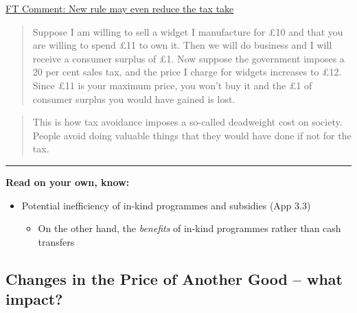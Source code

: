 \documentclass[]{article}
\providecommand{\tightlist}{%
  \setlength{\itemsep}{0pt}\setlength{\parskip}{0pt}}
\begin{document}
\href{https://www.ft.com/content/4ea6ab2c-f900-11e2-86e1-00144feabdc0}{FT
Comment: New rule may even reduce the tax take}

\begin{quote}
Suppose I am willing to sell a widget I manufacture for £10 and that you
are willing to spend £11 to own it. Then we will do business and I will
receive a consumer surplus of £1. Now suppose the government imposes a
20 per cent sales tax, and the price I charge for widgets increases to
£12. Since £11 is your maximum price, you won't buy it and the £1 of
consumer surplus you would have gained is lost.
\end{quote}

\begin{quote}
This is how tax avoidance imposes a so-called deadweight cost on
society. People avoid doing valuable things that they would have done if
not for the tax.
\end{quote}

\begin{center}\rule{0.5\linewidth}{\linethickness}\end{center}

\textbf{Read on your own, know:}

\begin{itemize}
\item
  Potential inefficiency of in-kind programmes and subsidies (App 3.3)

  \begin{itemize}
  \tightlist
  \item
    On the other hand, the \emph{benefits} of in-kind programmes rather
    than cash transfers
  \end{itemize}
\end{itemize}



\hypertarget{changes-in-the-price-of-another-good-what-impact}{%
\subsection{Changes in the Price of Another Good -- what
impact?}\label{changes-in-the-price-of-another-good-what-impact}}
\end{document}
